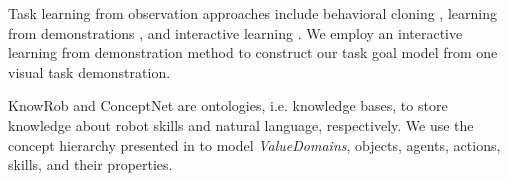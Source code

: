 Task learning from observation approaches include behavioral cloning \cite{bco}, learning from demonstrations \cite{learningFromDemonstrations}, and interactive learning \cite{interactiveLearning}. We employ an interactive learning from demonstration method to construct our task goal model from one visual task demonstration.

KnowRob \cite{knowrob} and ConceptNet \cite{conceptNet} are ontologies, i.e. knowledge bases, to store knowledge about robot skills and natural language, respectively. We use the concept hierarchy presented in \cite{conceptHierarchyGeriatronicsSummit24} to model \textit{ValueDomains}, objects, agents, actions, skills, and their properties.
